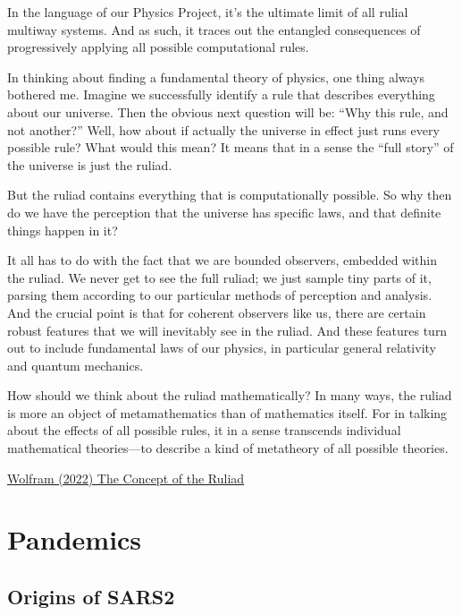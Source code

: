\documentclass[
]{book}
\begin{document}
In the language of our Physics Project, it's the ultimate limit of all rulial multiway systems. And as such, it traces out the entangled consequences of progressively applying all possible computational rules.

In thinking about finding a fundamental theory of physics, one thing always bothered me. Imagine we successfully identify a rule that describes everything about our universe. Then the obvious next question will be: ``Why this rule, and not another?'' Well, how about if actually the universe in effect just runs every possible rule? What would this mean? It means that in a sense the ``full story'' of the universe is just the ruliad.

But the ruliad contains everything that is computationally possible. So why then do we have the perception that the universe has specific laws, and that definite things happen in it?

It all has to do with the fact that we are bounded observers, embedded within the ruliad. We never get to see the full ruliad; we just sample tiny parts of it, parsing them according to our particular methods of perception and analysis. And the crucial point is that for coherent observers like us, there are certain robust features that we will inevitably see in the ruliad. And these features turn out to include fundamental laws of our physics, in particular general relativity and quantum mechanics.

How should we think about the ruliad mathematically? In many ways, the ruliad is more an object of metamathematics than of mathematics itself. For in talking about the effects of all possible rules, it in a sense transcends individual mathematical theories---to describe a kind of metatheory of all possible theories.

\href{https://writings.stephenwolfram.com/2021/11/the-concept-of-the-ruliad/\#:~:text=November\%2010\%2C\%202021-,The\%20Entangled\%20Limit\%20of\%20Everything,arisen\%20from\%20our\%20Physics\%20Project}{Wolfram (2022) The Concept of the Ruliad}

\hypertarget{pandemics}{%
\chapter{Pandemics}\label{pandemics}}

\hypertarget{origins-of-sars2}{%
\section{Origins of SARS2}\label{origins-of-sars2}}
\end{document}
